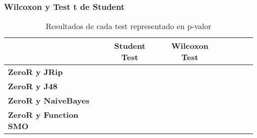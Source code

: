 \subsubsection{Wilcoxon y Test t de Student}

\begin{table}[H]
	\centering
	\begin{tabular}{|l|c|c|c|c|c|c|}
		\hline
		\textbf{}  & \textbf{Student Test} & \textbf{Wilcoxon Test} \\ \hline
		\textbf{ZeroR y JRip}  &  &  \\ \hline
		\textbf{ZeroR y J48}  &  &  \\ \hline
		\textbf{ZeroR y NaiveBayes}  &  &  \\ \hline
		\textbf{ZeroR y Function SMO}  &  & \\ \hline
	\end{tabular}
	\caption{Resultados de cada test representado en p-valor}
	\label{res_tests_wilcoxon_student}
\end{table}

